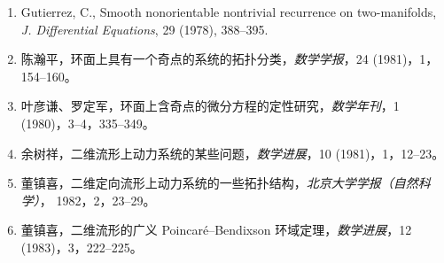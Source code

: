 \begin{enumerate}
{  Geometry}, Academic Press, 1975.
  \item Gutierrez, C., Smooth nonorientable nontrivial recurrence on two-manifolds,
  \textit{J. Differential Equations}, 29 (1978), 388--395.
  \item 陈瀚平，环面上具有一个奇点的系统的拓扑分类，\textit{数学学报}，24 (1981)，1，154--160。
  \item 叶彦谦、罗定军，环面上含奇点的微分方程的定性研究，\textit{数学年刊}，1 (1980)，3--4，335--349。
  \item 余树祥，二维流形上动力系统的某些问题，\textit{数学进展}，10 (1981)，1，12--23。
  \item 董镇喜，二维定向流形上动力系统的一些拓扑结构，\textit{北京大学学报（自然科学）}，
  1982，2，23--29。
  \item 董镇喜，二维流形的广义 Poincar\'e--Bendixson 环域定理，\textit{数学进展}，12
  (1983)，3，222--225。
\end{enumerate}

\endinput
